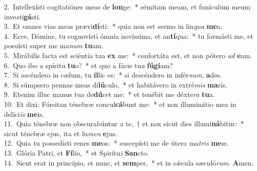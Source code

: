 {2.~}Intellexísti cogitatiónes meas de \textbf{lon}ge:~* sémitam meam, et funículum meum inve\textit{sti}\textbf{gá}sti.\\
{3.~}Et omnes vias meas prævi\textbf{dí}sti:~* quia non est sermo in lin\textit{gua} \textbf{me}a.\\
{4.~}Ecce, Dómine, tu cognovísti ómnia novíssima, et an\textbf{tí}qua:~* tu formásti me, et posuísti super me ma\textit{num} \textbf{tu}am.\\
{5.~}Mirábilis facta est sciéntia tua \textbf{ex} me:~* confortáta est, et non pótero \textit{ad} \textbf{e}am.\\
{6.~}Quo ibo a spíritu \textbf{tu}o?~* et quo a fácie tu\textit{a} \textbf{fú}\textbf{gi}am?\\
{7.~}Si ascéndero in cælum, tu \textbf{il}lic es:~* si descéndero in infér\textit{num}, \textbf{a}des.\\
{8.~}Si súmpsero pennas meas di\textbf{lú}culo,~* et habitávero in extré\textit{mis} \textbf{ma}ris.\\
{9.~}Etenim illuc manus tua de\textbf{dú}cet me:~* et tenébit me déxte\textit{ra} \textbf{tu}a.\\
{10.~}Et dixi: Fórsitan ténebræ concul\textbf{cá}bunt me:~* et nox illuminátio mea in delíci\textit{is} \textbf{me}is.\\
{11.~}Quia ténebræ non obscurabúntur a te,~† et nox sicut dies illumi\textbf{ná}bitur:~* sicut ténebræ ejus, ita et lu\textit{men} \textbf{e}jus.\\
{12.~}Quia tu possedísti renes \textbf{me}os:~* suscepísti me de útero ma\textit{tris} \textbf{me}æ.\\
{13.~}Glória Patri, et \textbf{Fí}lio,~* et Spirítu\textit{i} \textbf{San}cto.\\
{14.~}Sicut erat in princípio, et nunc, et \textbf{sem}per,~* et in sǽcula sæculó\textit{rum}. \textbf{A}men.\\

